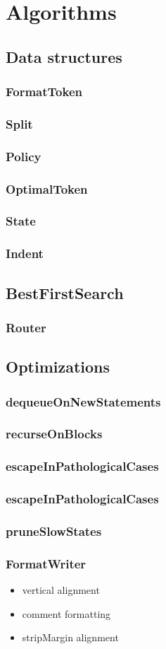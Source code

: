 \section{Algorithms}\label{sec:algorithms}
\subsection{Data structures}
\subsubsection{FormatToken}
\subsubsection{Split}
\subsubsection{Policy}
\subsubsection{OptimalToken}
\subsubsection{State}
\subsubsection{Indent}
\subsection{BestFirstSearch}
\subsubsection{Router}
\subsection{Optimizations}
\subsubsection{dequeueOnNewStatements}
\subsubsection{recurseOnBlocks}
\subsubsection{escapeInPathologicalCases}
\subsubsection{escapeInPathologicalCases}
\subsubsection{pruneSlowStates}
\subsubsection{FormatWriter}
\begin{itemize}
  \item vertical alignment
  \item comment formatting
  \item stripMargin alignment
\end{itemize}
